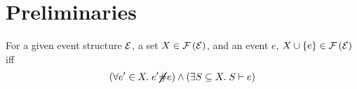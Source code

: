 \section{Preliminaries}

\begin{prop}\label{prop:es-induction}
For a given event structure $\mathcal{E}$, a set $X \in \mathcal{F} \left( \mathcal{E} \right)$,
and an event $e$, $X \cup \left\{ e \right\} \in \mathcal{F} \left( \mathcal{E} \right)$ iff
\[ ( \forall e' \in X.\; e' \cancel{\#} e ) \wedge
  ( \exists S \subseteq X.\; S \vdash e ) \]
\end{prop}